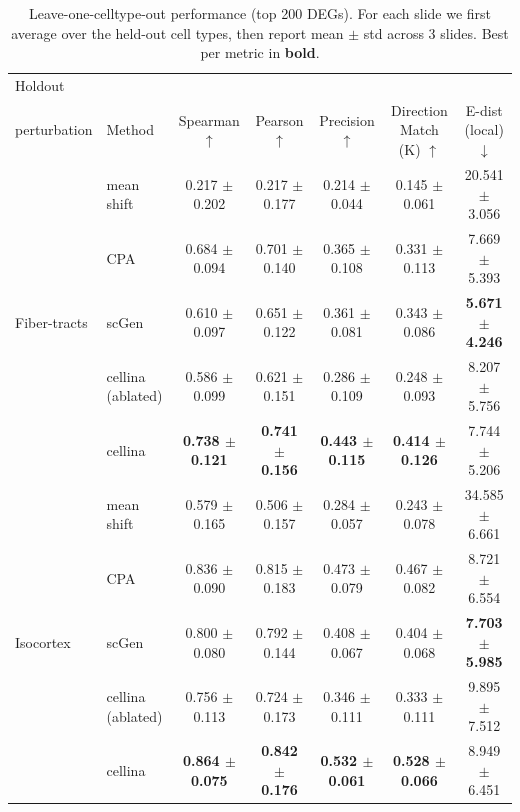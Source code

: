\begin{table}[t]
\centering
\caption{Leave-one-celltype-out performance (top 200 DEGs). For each slide we first average over the held-out cell types, then report mean $\pm$ std across 3 slides. Best per metric in \textbf{bold}.}
\label{tab:loo_summary_merfish}
\begin{tabular}{llccccc}
\toprule
Holdout \\ perturbation & Method & Spearman $\uparrow$ & Pearson $\uparrow$ & Precision $\uparrow$ & Direction Match (K) $\uparrow$ & E-dist (local) $\downarrow$ \\
\toprule

\multirow[c]{5}{*}{Fiber-tracts} & mean shift & 0.217 $\pm$ 0.202 & 0.217 $\pm$ 0.177 & 0.214 $\pm$ 0.044 & 0.145 $\pm$ 0.061 & 20.541 $\pm$ 3.056 \\
 & CPA & 0.684 $\pm$ 0.094 & 0.701 $\pm$ 0.140 & 0.365 $\pm$ 0.108 & 0.331 $\pm$ 0.113 & 7.669 $\pm$ 5.393 \\
 & scGen & 0.610 $\pm$ 0.097 & 0.651 $\pm$ 0.122 & 0.361 $\pm$ 0.081 & 0.343 $\pm$ 0.086 & \textbf{5.671 $\pm$ 4.246} \\
 & cellina (ablated) & 0.586 $\pm$ 0.099 & 0.621 $\pm$ 0.151 & 0.286 $\pm$ 0.109 & 0.248 $\pm$ 0.093 & 8.207 $\pm$ 5.756 \\
 & cellina & \textbf{0.738 $\pm$ 0.121} & \textbf{0.741 $\pm$ 0.156} & \textbf{0.443 $\pm$ 0.115} & \textbf{0.414 $\pm$ 0.126} & 7.744 $\pm$ 5.206 \\

\multirow[c]{5}{*}{Isocortex} & mean shift & 0.579 $\pm$ 0.165 & 0.506 $\pm$ 0.157 & 0.284 $\pm$ 0.057 & 0.243 $\pm$ 0.078 & 34.585 $\pm$ 6.661 \\
 & CPA & 0.836 $\pm$ 0.090 & 0.815 $\pm$ 0.183 & 0.473 $\pm$ 0.079 & 0.467 $\pm$ 0.082 & 8.721 $\pm$ 6.554 \\
 & scGen & 0.800 $\pm$ 0.080 & 0.792 $\pm$ 0.144 & 0.408 $\pm$ 0.067 & 0.404 $\pm$ 0.068 & \textbf{7.703 $\pm$ 5.985} \\
 & cellina (ablated) & 0.756 $\pm$ 0.113 & 0.724 $\pm$ 0.173 & 0.346 $\pm$ 0.111 & 0.333 $\pm$ 0.111 & 9.895 $\pm$ 7.512 \\
 & cellina & \textbf{0.864 $\pm$ 0.075} & \textbf{0.842 $\pm$ 0.176} & \textbf{0.532 $\pm$ 0.061} & \textbf{0.528 $\pm$ 0.066} & 8.949 $\pm$ 6.451 \\

\bottomrule
\end{tabular}
\end{table}
